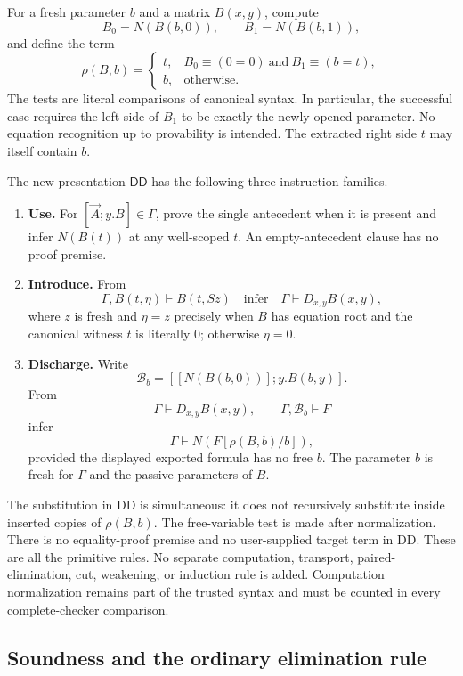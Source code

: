 For a fresh parameter $b$ and a matrix $B(x,y)$, compute
\[
 B_0=N(B(b,0)),\qquad B_1=N(B(b,1)),
\]
and define the term
\[
 \rho(B,b)=
 \begin{cases}
 t,& B_0\equiv(0=0)\ \text{and}\ B_1\equiv(b=t),\\
 b,& \text{otherwise}.
 \end{cases}
 \tag{\(\rho\)}\label{dd:rho}
\]
The tests are literal comparisons of canonical syntax.  In particular, the
successful case requires the left side of $B_1$ to be exactly the newly
opened parameter.  No equation recognition up to provability is intended.
The extracted right side $t$ may itself contain $b$.

The new presentation $\mathsf{DD}$ has the following three instruction
families.
\begin{enumerate}
\item \textbf{Use.} For $[\vec A;y.B]\in\Gamma$, prove the single
antecedent when it is present and infer $N(B(t))$ at any well-scoped $t$.
An empty-antecedent clause has no proof premise.
\item \textbf{Introduce.} From
\[
 \Gamma,B(t,\eta)\vdash B(t,Sz)
 \quad\text{infer}\quad
 \Gamma\vdash D_{x,y}B(x,y),
\]
where $z$ is fresh and $\eta=z$ precisely when $B$ has equation root and
the canonical witness $t$ is literally $0$; otherwise $\eta=0$.
\item \textbf{Discharge.} Write
\[
  \mathcal B_b=[[N(B(b,0))];y.B(b,y)].
\]
From
\[
 \Gamma\vdash D_{x,y}B(x,y),\qquad
 \Gamma,\mathcal B_b\vdash F
\]
infer
\[
       \Gamma\vdash N(F[\rho(B,b)/b]),
 \tag{DD}\label{dd:rule}
\]
provided the displayed exported formula has no free $b$.
The parameter $b$ is fresh for $\Gamma$ and the passive parameters of $B$.
\end{enumerate}
The substitution in DD is simultaneous: it does not recursively substitute
inside inserted copies of $\rho(B,b)$.  The free-variable test is made after
normalization.  There is no equality-proof premise and no user-supplied
target term in DD.  These are all the primitive rules.  No separate
computation, transport, paired-elimination, cut, weakening, or induction
rule is added.  Computation normalization remains part of the trusted
syntax and must be counted in every complete-checker comparison.

\subsection{Soundness and the ordinary elimination rule}


